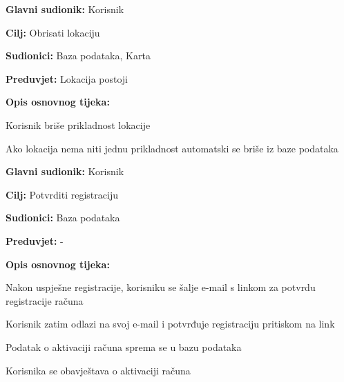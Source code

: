                 \noindent {}
					\begin{packed_item}
	
						\item \textbf{Glavni sudionik: } Korisnik
						\item  \textbf{Cilj:} Obrisati lokaciju
						\item  \textbf{Sudionici:} Baza podataka, Karta
						\item  \textbf{Preduvjet:} Lokacija postoji
						\item  \textbf{Opis osnovnog tijeka:}
						
						\item[] \begin{packed_enum}
	
							\item Korisnik briše prikladnost lokacije
                                \item Ako lokacija nema niti jednu prikladnost automatski se briše iz baze podataka
							
						\end{packed_enum}
					\end{packed_item}

                \noindent {}
					\begin{packed_item}
	
						\item \textbf{Glavni sudionik: } Korisnik
						\item  \textbf{Cilj:} Potvrditi registraciju 
						\item  \textbf{Sudionici:} Baza podataka
						\item  \textbf{Preduvjet:} -
						\item  \textbf{Opis osnovnog tijeka:}
						
						\item[] \begin{packed_enum}
	
							\item Nakon uspješne registracije, korisniku se šalje e-mail s linkom
                                za potvrdu registracije računa
                                \item Korisnik zatim odlazi na svoj e-mail i potvrđuje registraciju pritiskom na link
                                \item Podatak o aktivaciji računa sprema se u bazu podataka
                                \item Korisnika se obavještava o aktivaciji računa
							
						\end{packed_enum}
					\end{packed_item}
     
